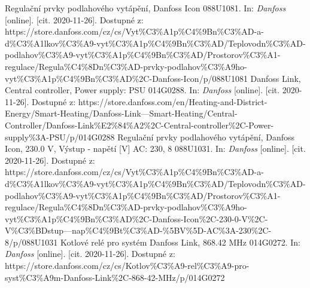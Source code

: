 \begin{thebibliography}{3}
Regulační prvky podlahového vytápění, Danfoss Icon 088U1081. In: \textit{Danfoss} [online]. [cit. 2020-11-26]. Dostupné z: https://store.danfoss.com/cz/cs/Vyt\%C3\%A1p\%C4\%9Bn\%C3\%AD-a-d\%C3\%A1lkov\%C3\%A9-vyt\%C3\%A1p\%C4\%9Bn\%C3\%AD/Teplovodn\%C3\%AD-podlahov\%C3\%A9-vyt\%C3\%A1p\%C4\%9Bn\%C3\%AD/Prostorov\%C3\%A1-regulace/Regula\%C4\%8Dn\%C3\%AD-prvky-podlahov\%C3\%A9ho-vyt\%C3\%A1p\%C4\%9Bn\%C3\%AD\%2C-Danfoss-Icon/p/088U1081
Danfoss Link, Central controller, Power supply: PSU 014G0288. In: \textit{Danfoss} [online]. [cit. 2020-11-26]. Dostupné z: https://store.danfoss.com/en/Heating-and-District-Energy/Smart-Heating/Danfoss-Link---Smart-Heating/Central-Controller/Danfoss-Link\%E2\%84\%A2\%2C-Central-controller\%2C-Power-supply\%3A-PSU/p/014G0288
Regulační prvky podlahového vytápění, Danfoss Icon, 230.0 V, Výstup - napětí [V] AC: 230, 8 088U1031. In: \textit{Danfoss} [online]. [cit. 2020-11-26]. Dostupné z: https://store.danfoss.com/cz/cs/Vyt\%C3\%A1p\%C4\%9Bn\%C3\%AD-a-d\%C3\%A1lkov\%C3\%A9-vyt\%C3\%A1p\%C4\%9Bn\%C3\%AD/Teplovodn\%C3\%AD-podlahov\%C3\%A9-vyt\%C3\%A1p\%C4\%9Bn\%C3\%AD/Prostorov\%C3\%A1-regulace/Regula\%C4\%8Dn\%C3\%AD-prvky-podlahov\%C3\%A9ho-vyt\%C3\%A1p\%C4\%9Bn\%C3\%AD\%2C-Danfoss-Icon\%2C-230-0-V\%2C-V\%C3\%BDstup---nap\%C4\%9Bt\%C3\%AD-\%5BV\%5D-AC\%3A-230\%2C-8/p/088U1031
Kotlové relé pro systém Danfoss Link, 868.42 MHz 014G0272. In: \textit{Danfoss} [online]. [cit. 2020-11-26]. Dostupné z: https://store.danfoss.com/cz/cs/Kotlov\%C3\%A9-rel\%C3\%A9-pro-syst\%C3\%A9m-Danfoss-Link\%2C-868-42-MHz/p/014G0272







\end{thebibliography}